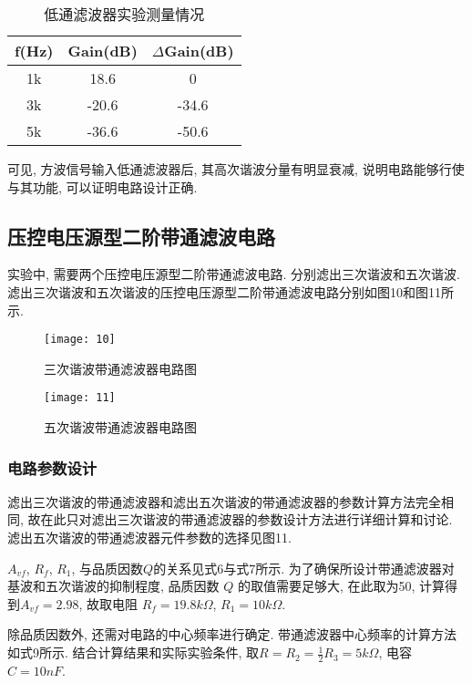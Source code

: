 \documentclass[UTF2]{ctexart}
\begin{document}
	\begin{table}[h]
		\centering
		\caption{低通滤波器实验测量情况}
		\begin{tabular}{c c c}
			\hline
			f(Hz) & Gain(dB) & $\Delta$Gain(dB)  \\
			\hline
			1k & 18.6 & 0 \\
			3k & -20.6 & -34.6 \\
			5k & -36.6 & -50.6 \\
			\hline
		\end{tabular}
	\end{table}
	
	可见, 方波信号输入低通滤波器后, 其高次谐波分量有明显衰减, 说明电路能够行使与其功能, 可以证明电路设计正确.
	
	\subsection{压控电压源型二阶带通滤波电路}
	
	实验中, 需要两个压控电压源型二阶带通滤波电路. 分别滤出三次谐波和五次谐波. 滤出三次谐波和五次谐波的压控电压源型二阶带通滤波电路分别如图10和图11所示. 
	
	\begin{figure}[h]
		\centering
		\texttt{[image: 10]}
		\caption{三次谐波带通滤波器电路图}
	\end{figure}
	
	\begin{figure}[h]
		\centering
		\texttt{[image: 11]}
		\caption{五次谐波带通滤波器电路图}
	\end{figure}
	
	\subsubsection{电路参数设计}
	
	滤出三次谐波的带通滤波器和滤出五次谐波的带通滤波器的参数计算方法完全相同, 故在此只对滤出三次谐波的带通滤波器的参数设计方法进行详细计算和讨论. 滤出五次谐波的带通滤波器元件参数的选择见图11.
	
	$A_{vf}$, $R_f$, $R_1$, 与品质因数$Q$的关系见式6与式7所示. 为了确保所设计带通滤波器对基波和五次谐波的抑制程度, 品质因数 $Q$ 的取值需要足够大, 在此取为50, 计算得到$A_{vf} = 2.98$, 故取电阻 $R_f = 19.8k \Omega$, $R_1 = 10k \Omega$.
	
	除品质因数外, 还需对电路的中心频率进行确定. 带通滤波器中心频率的计算方法如式9所示. 结合计算结果和实际实验条件, 取$ R = R_2 = \frac{1}{2} R_3 = 5k \Omega $, 电容$ C = 10nF $.
	
\end{document}
